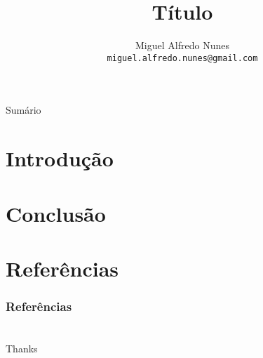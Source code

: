 \documentclass{beamer}
\title{Título}
\author{Miguel Alfredo Nunes \\ \small{\texttt{miguel.alfredo.nunes@gmail.com}}}
\date{}
\begin{document}
    \begin{frame}
        \titlepage
    \end{frame}

    \begin{frame}{Sumário}
        \tableofcontents
    \end{frame}

    \section{Introdução}
    \label{sec:introducao}
        
        \SecT
        

    \section{Conclusão}
        \label{sec:conclusao}

        \SecT

        

    \section{Referências}
        \label{sec:referencias}

        \SecT

        \begin{frame}[allowframebreaks]
            \frametitle{Referências}

            
            
        \end{frame}

    \section*{}
    \begin{frame}{}

        \begin{center}
            {\Huge Thanks}
            
            \vspace{\baselineskip}

            \vspace{\baselineskip}
            
            \insertauthor
        \end{center}
        
    \end{frame}
\end{document}

